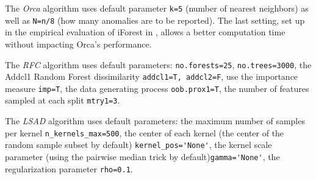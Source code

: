 The \emph{Orca} algorithm uses default parameter \verb+k=5+ (number of nearest neighbors)
as well as \verb+N=n/8+ (how many anomalies are to be reported).
The last setting, set up in the empirical evaluation of iForest in \cite{Liu2012},
allows a better computation time without impacting Orca's performance.


The \emph{RFC} algorithm uses default parameters:
\verb+no.forests=25+, \verb+no.trees=3000+,
the Addcl1 Random Forest dissimilarity \verb+addcl1=T, addcl2=F+,
use the importance measure \verb+imp=T+,
the data generating process \verb+oob.prox1=T+,
the number of features sampled at each split \verb+mtry1=3+.

The \emph{LSAD} algorithm uses default parameters:
the maximum number of samples per kernel \verb+n_kernels_max=500+,
the center of each kernel (the center of the random sample subset by default) \verb+kernel_pos='None'+,
the kernel scale parameter (using the pairwise median trick by default)\verb+gamma='None'+,
the regularization parameter \verb+rho=0.1+.

